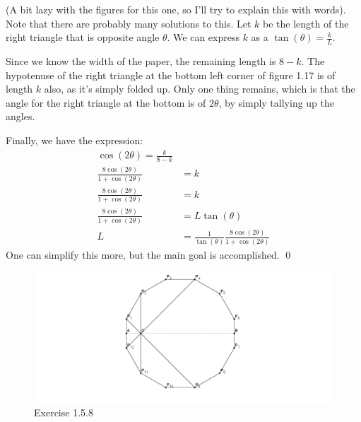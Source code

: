 \begin{Exercise}
	(A bit lazy with the figures for this one, so I'll try to explain this with words).
	Note that there are probably many solutions to this.
	Let $k$ be the length of the right triangle that is opposite angle $\theta$. 
	We can express $k$ as a $\tan(\theta) = \frac{k}{L}$. 

	Since we know the width of the paper, the remaining length is $8-k$. 
	The hypotenuse of the right triangle at the bottom left corner of figure 1.17 is of length $k$ also, as it's simply folded up.
	Only one thing remains, which is that the angle for the right triangle at the bottom is of $2\theta$, by simply tallying up the angles.

	Finally, we have the expression:
	\begin{align}
		\cos(2\theta) = \frac{k}{8-k} \\
		\frac{8\cos(2\theta)}{1 + \cos(2\theta)} &= k \\
		\frac{8\cos(2\theta)}{1 + \cos(2\theta)} &= k \\
		\frac{8\cos(2\theta)}{1 + \cos(2\theta)} &= L\tan(\theta) \\
		L &= \frac{1}{\tan(\theta)}\frac{8\cos(2\theta)}{1 + \cos(2\theta)}
	\end{align}
	One can simplify this more, but the main goal is accomplished.	\qed
\end{Exercise}

\begin{figure}[h]
	\centering
	\includegraphics[width=1.2\textwidth]{./figures/chpt1/1_5_8.png}
	\caption{Exercise 1.5.8}
	\label{fig:1_5_8}
\end{figure}

